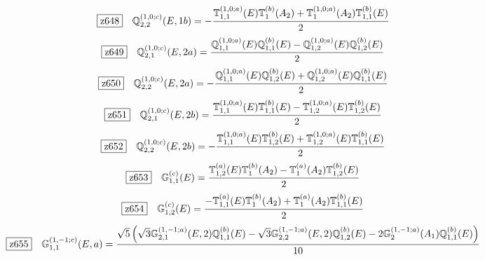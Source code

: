 \documentclass[fleqn,10pt,landscape]{jsarticle}
\begin{document}
\begin{dmath*}
\hspace*{3mm}\fbox{z648}\quad \mathbb{Q}_{2,2}^{(1,0;c)}(E,1b)=- \frac{\mathbb{T}_{1,1}^{(1,0;a)}(E) \mathbb{T}_{1}^{(b)}(A_{2}) + \mathbb{T}_{1}^{(1,0;a)}(A_{2}) \mathbb{T}_{1,1}^{(b)}(E)}{2}
\end{dmath*}
\begin{dmath*}
\hspace*{3mm}\fbox{z649}\quad \mathbb{Q}_{2,1}^{(1,0;c)}(E,2a)=\frac{\mathbb{Q}_{1,1}^{(1,0;a)}(E) \mathbb{Q}_{1,1}^{(b)}(E) - \mathbb{Q}_{1,2}^{(1,0;a)}(E) \mathbb{Q}_{1,2}^{(b)}(E)}{2}
\end{dmath*}
\begin{dmath*}
\hspace*{3mm}\fbox{z650}\quad \mathbb{Q}_{2,2}^{(1,0;c)}(E,2a)=- \frac{\mathbb{Q}_{1,1}^{(1,0;a)}(E) \mathbb{Q}_{1,2}^{(b)}(E) + \mathbb{Q}_{1,2}^{(1,0;a)}(E) \mathbb{Q}_{1,1}^{(b)}(E)}{2}
\end{dmath*}
\begin{dmath*}
\hspace*{3mm}\fbox{z651}\quad \mathbb{Q}_{2,1}^{(1,0;c)}(E,2b)=\frac{\mathbb{T}_{1,1}^{(1,0;a)}(E) \mathbb{T}_{1,1}^{(b)}(E) - \mathbb{T}_{1,2}^{(1,0;a)}(E) \mathbb{T}_{1,2}^{(b)}(E)}{2}
\end{dmath*}
\begin{dmath*}
\hspace*{3mm}\fbox{z652}\quad \mathbb{Q}_{2,2}^{(1,0;c)}(E,2b)=- \frac{\mathbb{T}_{1,1}^{(1,0;a)}(E) \mathbb{T}_{1,2}^{(b)}(E) + \mathbb{T}_{1,2}^{(1,0;a)}(E) \mathbb{T}_{1,1}^{(b)}(E)}{2}
\end{dmath*}
\begin{dmath*}
\hspace*{3mm}\fbox{z653}\quad \mathbb{G}_{1,1}^{(c)}(E)=\frac{\mathbb{T}_{1,2}^{(a)}(E) \mathbb{T}_{1}^{(b)}(A_{2}) - \mathbb{T}_{1}^{(a)}(A_{2}) \mathbb{T}_{1,2}^{(b)}(E)}{2}
\end{dmath*}
\begin{dmath*}
\hspace*{3mm}\fbox{z654}\quad \mathbb{G}_{1,2}^{(c)}(E)=\frac{- \mathbb{T}_{1,1}^{(a)}(E) \mathbb{T}_{1}^{(b)}(A_{2}) + \mathbb{T}_{1}^{(a)}(A_{2}) \mathbb{T}_{1,1}^{(b)}(E)}{2}
\end{dmath*}
\begin{dmath*}
\hspace*{3mm}\fbox{z655}\quad \mathbb{G}_{1,1}^{(1,-1;c)}(E,a)=\frac{\sqrt{5} \left(\sqrt{3} \mathbb{G}_{2,1}^{(1,-1;a)}(E,2) \mathbb{Q}_{1,1}^{(b)}(E) - \sqrt{3} \mathbb{G}_{2,2}^{(1,-1;a)}(E,2) \mathbb{Q}_{1,2}^{(b)}(E) - 2 \mathbb{G}_{2}^{(1,-1;a)}(A_{1}) \mathbb{Q}_{1,1}^{(b)}(E)\right)}{10}
\end{dmath*}
\end{document}
